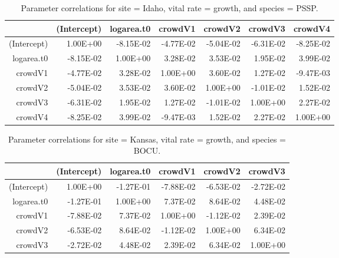\documentclass[12pt,]{article}
\begin{document}
\begin{table}[ht]
\centering
\caption{Parameter correlations for site = Idaho, vital rate = growth, and species = PSSP.} 
\begin{tabular}{rrrrrrr}
  \hline
 & (Intercept) & logarea.t0 & crowdV1 & crowdV2 & crowdV3 & crowdV4 \\ 
  \hline
(Intercept) & 1.00E+00 & -8.15E-02 & -4.77E-02 & -5.04E-02 & -6.31E-02 & -8.25E-02 \\ 
  logarea.t0 & -8.15E-02 & 1.00E+00 & 3.28E-02 & 3.53E-02 & 1.95E-02 & 3.99E-02 \\ 
  crowdV1 & -4.77E-02 & 3.28E-02 & 1.00E+00 & 3.60E-02 & 1.27E-02 & -9.47E-03 \\ 
  crowdV2 & -5.04E-02 & 3.53E-02 & 3.60E-02 & 1.00E+00 & -1.01E-02 & 1.52E-02 \\ 
  crowdV3 & -6.31E-02 & 1.95E-02 & 1.27E-02 & -1.01E-02 & 1.00E+00 & 2.27E-02 \\ 
  crowdV4 & -8.25E-02 & 3.99E-02 & -9.47E-03 & 1.52E-02 & 2.27E-02 & 1.00E+00 \\ 
   \hline
\end{tabular}
\end{table}

\newpage{}

\begin{table}[ht]
\centering
\caption{Parameter correlations for site = Kansas, vital rate = growth, and species = BOCU.} 
\begin{tabular}{rrrrrr}
  \hline
 & (Intercept) & logarea.t0 & crowdV1 & crowdV2 & crowdV3 \\ 
  \hline
(Intercept) & 1.00E+00 & -1.27E-01 & -7.88E-02 & -6.53E-02 & -2.72E-02 \\ 
  logarea.t0 & -1.27E-01 & 1.00E+00 & 7.37E-02 & 8.64E-02 & 4.48E-02 \\ 
  crowdV1 & -7.88E-02 & 7.37E-02 & 1.00E+00 & -1.12E-02 & 2.39E-02 \\ 
  crowdV2 & -6.53E-02 & 8.64E-02 & -1.12E-02 & 1.00E+00 & 6.34E-02 \\ 
  crowdV3 & -2.72E-02 & 4.48E-02 & 2.39E-02 & 6.34E-02 & 1.00E+00 \\ 
   \hline
\end{tabular}
\end{table}
\end{document}
